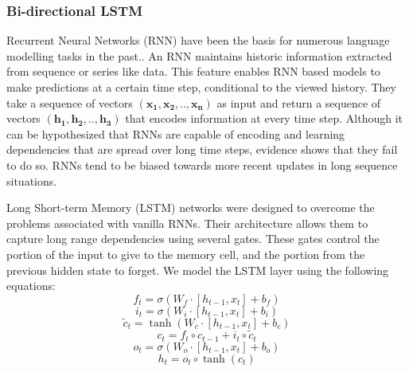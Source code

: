 \subsubsection{\textbf{Bi-directional LSTM}}
Recurrent Neural Networks (RNN) have been the basis for numerous language modelling tasks in the past.\cite{mikolov2010recurrent}. An RNN maintains historic information extracted from sequence or series like data. This feature enables RNN based models to make predictions at a certain time step, conditional to the viewed history. They take a sequence of vectors $\boldsymbol{(x_1, x_2, .., x_n)}$ as input and return a sequence of vectors $\boldsymbol{(h_1, h_2, .., h_3)}$ that encodes information at every time step.
Although it can be hypothesized that RNNs are capable of encoding and learning dependencies that are spread over long time steps, evidence shows that they fail to do so. RNNs tend to be biased towards more recent updates in long sequence situations.

Long Short-term Memory (LSTM) networks \cite{hochreiter1997long} were designed to overcome the problems associated with vanilla RNNs. Their architecture allows them to capture long range dependencies using several gates. These gates control the portion of the input to give to the memory cell, and the portion from the previous hidden state to forget. We model the LSTM layer using the following equations:
%
\begin{equation}
    f_{t}=\sigma(W_{f}\cdot[h_{t-1},x_{t}] + b_{f})
\end{equation}
\begin{equation}
    i_{t}=\sigma(W_{i}\cdot[h_{t-1},x_{t}] + b_{i})
\end{equation}
\begin{equation}
    {\tilde {c}}_{t}=\tanh(W_{c}\cdot[h_{t-1},x_{t}] + b_{c})
\end{equation}
\begin{equation}
    c_{t}= f_{t}\circ c_{t-1}+ i_{t}\circ {\tilde {c}}_{t}
\end{equation}
\begin{equation}
    o_{t}=\sigma(W_{o}\cdot[h_{t-1},x_{t}] + b_{o})
\end{equation}
\begin{equation}
    h_{t}=o_{t}\circ \tanh(c_{t})
\end{equation}

